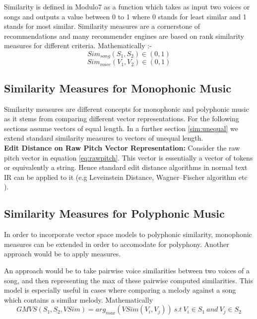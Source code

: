 \noindent Similarity is defined in Modulo7 as a function which takes as input two voices or songs and outputs a value between 0 to 1 where 0 stands for least similar and 1 stands for most similar. Similarity measures are a cornerstone of recommendations and many recommender engines are based on rank similarity measures for different criteria. Mathematically :-
\begin{equation}
Sim_{song}(S_1, S_2) \in (0, 1)
\end{equation}
\begin{equation}
Sim_{voice}(V_1, V_2) \in (0, 1)
\end{equation}

\subsection{Similarity Measures for Monophonic Music} \label{monophonicSim}

\noindent Similarity measures are different concepts for monophonic and polyphonic music as it stems from comparing different vector representations. For the following sections assume vectors of equal length. In a further section \ref{sim:unequal} we extend standard similarity measures to vectors of unequal length. \\

\noindent \textbf{Edit Distance on Raw Pitch Vector Representation:} Consider the raw pitch vector in equation \ref{eq:rawpitch}. This vector is essentially a vector of tokens or equivalently a string. Hence standard edit distance algorithms in normal text IR can be applied to it (e.g Leveinstein Distance, Wagner–Fischer algorithm etc \cite{simtour}).

\subsection{Similarity Measures for Polyphonic Music}

\noindent In order to incorporate vector space models to polyphonic similarity, monophonic measures can be extended in order to accomodate for polyphony. Another approach would be to apply measures.

 An approach would be to take pairwise voice similarities between two voices of a song, and then representing the max of these pairwise computed similarities. This model is especially useful in cases where comparing a melody against a song which contains a similar melody. Mathematically 
\begin{equation}
GMVS(S_1, S_2, VSim) = arg_{max} (VSim(V_i, V_j)) \ s.t \ V_i \in S_1 \ and \ V_j \in S_2
\end{equation}

